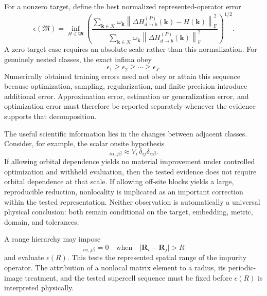 For a nonzero target, define the best normalized represented-operator error
\begin{equation}
  \epsilon(\mathfrak M)
  =
  \inf_{H\in\mathfrak M}
  \left(
  \frac{
    \sum_{\mathbf k\in\mathcal K}
    \omega_{\mathbf k}
    \left\|\Delta H_{d\to b}^{(P)}(\mathbf k)-H(\mathbf k)\right\|_{\mathrm F}^{2}
  }{
    \sum_{\mathbf k\in\mathcal K}
    \omega_{\mathbf k}
    \left\|\Delta H_{d\to b}^{(P)}(\mathbf k)\right\|_{\mathrm F}^{2}
  }
  \right)^{1/2}.
  \label{eq:model-class-error}
\end{equation}
A zero-target case requires an absolute scale rather than this normalization.
For genuinely nested classes, the exact infima obey
\begin{equation}
  \epsilon_1\geq\epsilon_2\geq\cdots\geq\epsilon_J.
\end{equation}
Numerically obtained training errors need not obey or attain this sequence
because optimization, sampling, regularization, and finite precision introduce
additional error. Approximation error, estimation or generalization error, and
optimization error must therefore be reported separately whenever the evidence
supports that decomposition.

The useful scientific information lies in the changes between adjacent
classes. Consider, for example, the scalar onsite hypothesis
\begin{equation}
  [\Delta H]_{i\alpha,j\beta}
  \approx
  V_i\,\delta_{ij}\delta_{\alpha\beta}.
  \label{eq:scalar-onsite-hypothesis}
\end{equation}
If allowing orbital dependence yields no material improvement under controlled
optimization and withheld evaluation, then the tested evidence does not require
orbital dependence at that scale. If allowing off-site blocks yields a large,
reproducible reduction, nonlocality is implicated as an important correction
within the tested representation. Neither observation is automatically a
universal physical conclusion: both remain conditional on the target,
embedding, metric, domain, and tolerances.

A range hierarchy may impose
\begin{equation}
  [\Delta H]_{i\alpha,j\beta}=0
  \quad\text{when}\quad
  \lvert\mathbf R_i-\mathbf R_j\rvert>R
\end{equation}
and evaluate $\epsilon(R)$. This tests the represented spatial range of the
impurity operator. The attribution of a nonlocal matrix element to a radius,
its periodic-image treatment, and the tested supercell sequence must be fixed
before $\epsilon(R)$ is interpreted physically.


